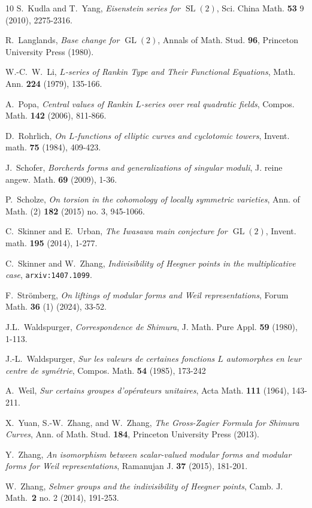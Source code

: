 \documentclass{amsart}
\theoremstyle{definition}
\begin{document}
\begin{thebibliography}{10}
 S.~Kudla and T.~Yang, {\it{Eisenstein series for $\operatorname{SL}(2)$}}, Sci. China Math. {\bf{53}} 9 (2010), 2275-2316. 

 R.~Langlands, {\it{Base change for $\operatorname{GL}(2)$}}, Annals of Math. Stud. {\bf{96}}, Princeton University Press (1980).

 W.-C.~W.~Li, {\it{$L$-series of Rankin Type and Their Functional Equations}}, Math. Ann. {\bf{224}} (1979), 135-166.

 A.~Popa, {\it{Central values of Rankin $L$-series over real quadratic fields}}, Compos. Math. {\bf{142}} (2006), 811-866.

 D.~Rohrlich, {\it{On $L$-functions of elliptic curves and cyclotomic towers}}, Invent. math. {\bf{75}} (1984), 409-423.

 J.~Schofer, {\it{Borcherds forms and generalizations of singular moduli}}, J. reine angew. Math. {\bf{69}} (2009), 1-36.

 P.~Scholze, {\it{On torsion in the cohomology of locally symmetric varieties}}, Ann. of Math. (2) {\bf{182}} (2015) no. 3, 945-1066.

 C.~Skinner and E.~Urban, {\it{The Iwasawa main conjecture for $\operatorname{GL}(2)$}}, Invent. math. {\bf{195}} (2014), 1-277. 

 C.~Skinner and W.~Zhang, {\it{Indivisibility of Heegner points in the multiplicative case}}, \texttt{arxiv:1407.1099}.

 F.~Str\"omberg, {\it{On liftings of modular forms and Weil representations}}, Forum Math. \textbf{36} (1) (2024), 33-52.

 J.L.~Waldspurger, {\it{Correspondence de Shimura}}, J. Math. Pure Appl. {\bf{59}} (1980), 1-113.

 J.-L.~Waldspurger, {\it{Sur les valeurs de certaines fonctions $L$ automorphes en leur centre de sym\'etrie}}, Compos. Math. {\bf{54}} (1985), 173-242

 A.~Weil, {\it{Sur certains groupes d'op\'erateurs unitaires}}, Acta Math. {\bf{111}} (1964), 143-211.


 X.~Yuan, S.-W.~Zhang, and W.~Zhang, {\it{The Gross-Zagier Formula for Shimura Curves}}, Ann. of Math. Stud. {\bf{184}}, Princeton University Press (2013).

 Y.~Zhang, {\it{An isomorphism between scalar-valued modular forms and modular forms for Weil representations}}, Ramanujan J. {\bf{37}} (2015), 181-201.

 W.~Zhang, {\it{Selmer groups and the indivisibility of Heegner points}}, Camb. J. Math.~{\bf{2}} no. 2 (2014), 191-253.

\end{thebibliography}
\end{document}
